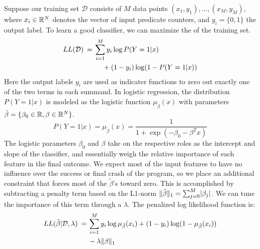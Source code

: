 Suppose our training set $\mathcal{D}$ consists of $M$ data points
$(x_1,y_1), \ldots, (x_M, y_M) $, where $x_i \in \mathbb{R}^N$ denotes the vector of
input predicate counters, and $y_i = \{0, 1\}$ the output label.  To
learn a good classifier, we can maximize the 
of the training set.
\begin{equation*}
  \begin{split}
    LL( \mathcal{D} ) \:=\:
    & \sum_{i=1}^M y_i \log P(Y = 1 | x) \\
    & \hskip12pt + (1 - y_i) \log (1 - P(Y = 1 | x))
  \end{split}
\end{equation*}
Here the output labels $y_i$ are used as indicater functions to zero
out exactly one of the two terms in each summand.  In logistic
regression, the distribution $P(Y=1|x)$ is modeled as the logistic
function $\mu_{\tilde\beta}(x)$ with parameters $\tilde\beta = \{ \beta_0 \in \mathbb{R}, \beta
\in \mathbb{R}^N \}$.
\begin{equation*}
  P(Y = 1 | x) = \mu_{\tilde \beta} (x) = \frac{1}{1 + \exp(- \beta_0 - \beta^T x)}
\end{equation*}
The logistic parameters $\beta_0$ and $\beta$ take on the respective roles
as the intercept and slope of the classifier, and essentially weigh
the relative importance of each feature in the final outcome.  We
expect most of the input features to have no influence over the
success or final crash of the program, so we place an additional
constraint that forces most of the $\tilde \beta$'s toward zero.  This is
accomplished by subtracting a penalty term based on the L1-norm
$\lVert\tilde \beta \rVert_1 = \sum_{j=0}^M \lvert\beta_j\rvert$.  We can tune the
importance of this  term through a
 $\lambda$.  The penalized log likelihood
function is:
\begin{equation*}
  \begin{split}
    LL (\tilde\beta | \mathcal{D}, \lambda ) \:=\:
    & \sum_{i=1}^M y_i \log \mu_{\tilde \beta} (x_i) + (1 - y_i) \log (1 - \mu_{ \tilde \beta } (x_i)) \\
    & - \lambda \lVert\beta\rVert_1
  \end{split}
\end{equation*}

